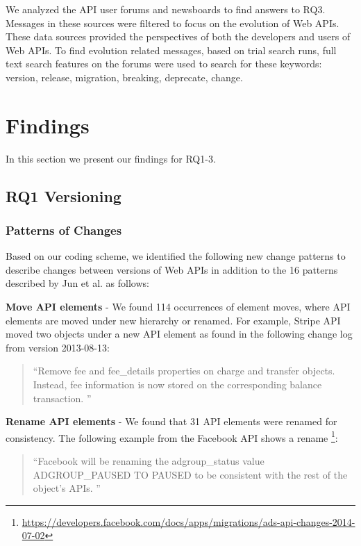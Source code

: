 We analyzed the API user forums and newsboards to find answers to RQ3. Messages in these sources were filtered to focus on the evolution of Web APIs. These data sources provided the perspectives of both the developers and users of Web APIs. To find evolution related messages, based on trial search runs, full text search features on the forums were used to search for these keywords: version, release, migration, breaking, deprecate, change.


\section{Findings} %
\label{sec:findings}

In this section we present our findings for RQ1-3.

\subsection{RQ1 Versioning} %
\label{sub:versioning}


\subsubsection{Patterns of Changes}

Based on our coding scheme, we identified the following new change patterns to describe changes between versions of Web APIs in addition to the 16 patterns described by Jun et al. \cite{li_client_2013} as follows:

\textbf{Move API elements} - We found 114 occurrences of element moves, where API elements are moved under new hierarchy or renamed. For example, Stripe API moved two objects under a new API element as found in the following change log from version 2013-08-13:

\small
\begin{quotation}
``Remove fee and fee\_details properties on charge and transfer objects. Instead, fee information is now stored on the corresponding balance transaction.
''\end{quotation}
\normalsize

\textbf{Rename API elements} - We found that 31 API elements were renamed for consistency. The following example from the Facebook API shows a rename \footnote{\url{https://developers.facebook.com/docs/apps/migrations/ads-api-changes-2014-07-02}}:

\small
\begin{quotation}
``Facebook will be renaming the adgroup\_status value ADGROUP\_PAUSED TO PAUSED to be consistent with the rest of the object's APIs.
''\end{quotation}
\normalsize

